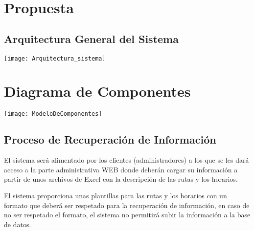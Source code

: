 \documentclass[12pt]{article} %
\begin{document}
\section{Propuesta} %

\subsection{Arquitectura General del Sistema} %
\begin{center}
	\texttt{[image: Arquitectura\_sistema]}
\end{center}
\pagebreak

\section{Diagrama de Componentes} %

\begin{center}
	\texttt{[image: ModeloDeComponentes]}
\end{center}
\pagebreak


\subsection{Proceso de Recuperación de Información} %

El sistema será alimentado por los clientes (administradores) a los que se les dará acceso a la parte administrativa WEB donde deberán cargar su información a partir de unos archivos de Excel con la descripción de las rutas y los horarios.

El sistema proporciona unas plantillas para las rutas y los horarios con un formato que deberá ser respetado para la recuperación de información, en caso de no ser respetado el formato, el sistema no permitirá subir la información a la base de datos.
\end{document}
